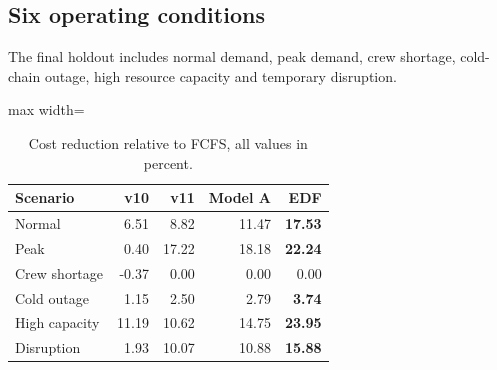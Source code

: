 \documentclass[10pt,a4paper]{article}
\theoremstyle{plain}
\theoremstyle{definition}
\theoremstyle{remark}
\begin{document}
\subsection{Six operating conditions}

The final holdout includes
normal demand,
peak demand,
crew shortage,
cold-chain outage,
high resource capacity
and temporary disruption.

\begin{table}[!htbp]
\centering
\caption{
Cost reduction relative to FCFS,
all values in percent.
}
\label{tab:sixcost}
\small
\begin{adjustbox}{max width=\linewidth}
\begin{tabular}{@{}lrrrr@{}}
\toprule
Scenario &
v10 &
v11 &
Model A &
EDF \\
\midrule
Normal & 6.51 & 8.82 & 11.47 & \textbf{17.53} \\
Peak & 0.40 & 17.22 & 18.18 & \textbf{22.24} \\
Crew shortage & -0.37 & 0.00 & 0.00 & 0.00 \\
Cold outage & 1.15 & 2.50 & 2.79 & \textbf{3.74} \\
High capacity & 11.19 & 10.62 & 14.75 & \textbf{23.95} \\
Disruption & 1.93 & 10.07 & 10.88 & \textbf{15.88} \\
\bottomrule
\end{tabular}
\end{adjustbox}
\end{table}
\end{document}
